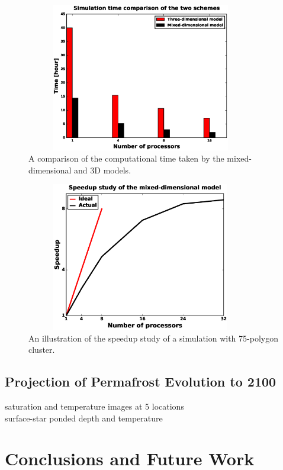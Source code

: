 \documentclass[review]{elsarticle}
\begin{document}
\begin{figure}[!htpb]
\centering
\includegraphics[height = 6.5cm, width=10cm]{figures/compare3d-lcs-speed.eps}
\caption{A comparison of the computational time taken by the mixed-dimensional and 3D models.}
\label{3d-lcs-speed}
\end{figure}


\begin{figure}[!htpb]
\centering
\includegraphics[height = 6.5cm, width=10cm]{figures/speedup-lcs.eps}
\caption{An illustration of the speedup study of a simulation with 75-polygon cluster.}
\label{lcs-speed}
\end{figure}

\subsection{Projection of Permafrost Evolution to 2100}
saturation and temperature images at 5 locations \\
surface-star ponded depth and temperature  

\section{Conclusions and Future Work}\label{conclusion}
\end{document}
